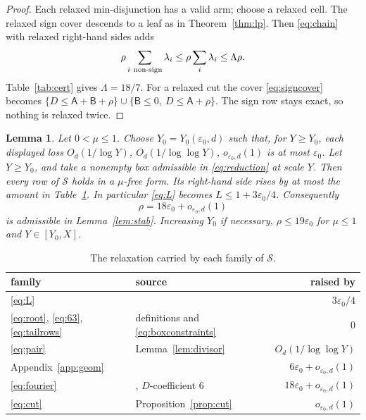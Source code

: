 \documentclass{amsart}
\newtheorem{lemma}{Lemma}[section]
\numberwithin{equation}{section}
\numberwithin{table}{section}
\begin{document}
\begin{proof}
Each relaxed min-disjunction has a valid arm; choose a relaxed cell. The
relaxed sign cover descends to a leaf as in Theorem~\ref{thm:lp}. Then
\eqref{eq:chain} with relaxed right-hand sides adds
\[
 \rho\sum_{i\ {\rm non\text{-}sign}}\lambda_i
 \le \rho\sum_i\lambda_i\le\Lambda\rho.
\]
Table~\ref{tab:cert} gives $\Lambda=18/7$. For a relaxed cut the cover
\eqref{eq:signcover} becomes
$\{D\le\mathsf A+\mathsf B+\rho\}\cup\{\mathsf B\le0,\ D\le\mathsf A+\rho\}$.
The sign row stays exact, so nothing is relaxed twice.
\end{proof}

\begin{lemma}\label{lem:endpoint}
Let $0<\mu\le1$. Choose $Y_0=Y_0(\varepsilon_0,d)$ such that, for $Y\ge Y_0$,
each displayed loss $O_d(1/\log Y)$, $O_d(1/\log\log Y)$,
$o_{\varepsilon_0,d}(1)$ is at most $\varepsilon_0$. Let $Y\ge Y_0$, and take a
nonempty box admissible in \eqref{eq:reduction} at scale $Y$. Then every row of
$\mathcal S$ holds in a $\mu$-free form. Its right-hand side rises by at most
the amount in Table~\ref{tab:rho}. In particular \eqref{eq:L} becomes
$L\le1+3\varepsilon_0/4$. Consequently
\begin{equation}\label{eq:rho}
 \rho=18\varepsilon_0+o_{\varepsilon_0,d}(1)
\end{equation}
is admissible in Lemma~\ref{lem:stab}. Increasing $Y_0$ if necessary,
$\rho\le19\varepsilon_0$ for $\mu\le1$ and $Y\in[Y_0,X]$.
\end{lemma}

\begin{table}[ht]
\centering\small
\caption{The relaxation carried by each family of $\mathcal S$.}\label{tab:rho}
\begin{tabular}{@{}llr@{}}
\hline family & source & raised by\\\hline
\eqref{eq:L} & \cite[(6.1)]{BBLT} & $3\varepsilon_0/4$\\
\eqref{eq:root}, \eqref{eq:63}, \eqref{eq:tailrows} & definitions and \eqref{eq:boxconstraints} & $0$\\
\eqref{eq:pair} & Lemma~\ref{lem:divisor} & $O_d(1/\log\log Y)$\\
Appendix~\ref{app:geom} & \cite[Proposition~4.1]{BBLT} & $6\varepsilon_0+o_{\varepsilon_0,d}(1)$\\
\eqref{eq:fourier} & \cite[Proposition~3.1]{BBLT}, $D$-coefficient $6$ & $18\varepsilon_0+o_{\varepsilon_0,d}(1)$\\
\eqref{eq:cut} & Proposition~\ref{prop:cut} & $o_{\varepsilon_0,d}(1)$\\
\hline
\end{tabular}
\end{table}
\end{document}
